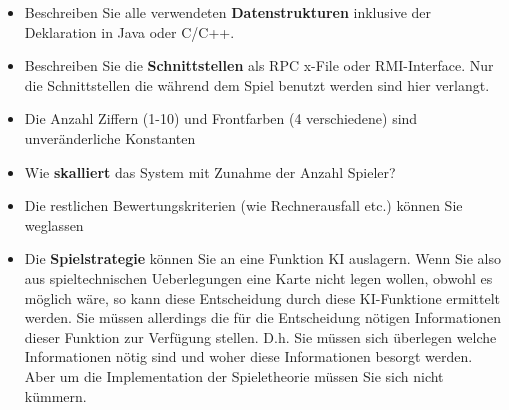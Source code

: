 \begin{itemize}
 \item Beschreiben Sie alle verwendeten \textbf{Datenstrukturen} inklusive der Deklaration in Java oder C/C++.
 \item Beschreiben Sie die \textbf{Schnittstellen} als RPC x-File oder RMI-Interface. Nur die Schnittstellen die während dem Spiel benutzt werden sind hier verlangt.
 \item Die Anzahl Ziffern (1-10) und Frontfarben (4 verschiedene) sind unveränderliche Konstanten
 \item Wie \textbf{skalliert} das System mit Zunahme der Anzahl Spieler?
 \item Die restlichen Bewertungskriterien (wie Rechnerausfall etc.) können Sie weglassen
 \item Die \textbf{Spielstrategie} können Sie an eine Funktion KI auslagern. Wenn Sie also aus spieltechnischen Ueberlegungen eine Karte nicht legen wollen, obwohl es möglich wäre, so kann diese Entscheidung durch diese KI-Funktione ermittelt werden. Sie müssen allerdings die für die Entscheidung nötigen Informationen dieser Funktion zur Verfügung stellen. D.h. Sie müssen sich überlegen welche Informationen nötig sind und woher diese Informationen besorgt werden. Aber um die Implementation der Spieletheorie müssen Sie sich nicht kümmern.
\end{itemize}
	
	
	
